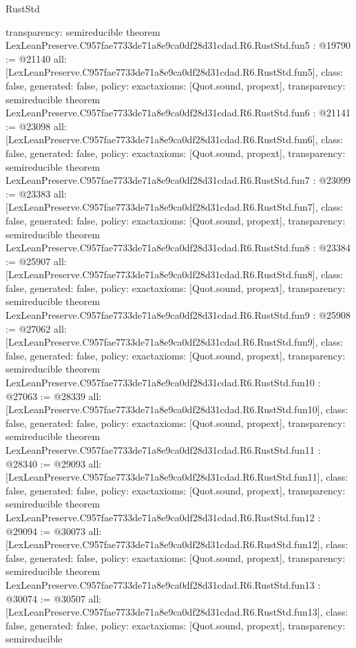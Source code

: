 \begin{lexlean}{RustStd}
\begin{coremodule}
{  transparency: semireducible
}
theorem LexLeanPreserve.C957fae7733de71a8e9ca0df28d31cdad.R6.RustStd.fun5 : @19790 := @21140 {
  all: [LexLeanPreserve.C957fae7733de71a8e9ca0df28d31cdad.R6.RustStd.fun5],
  class: false,
  generated: false,
  policy: exact{axioms: [Quot.sound, propext]},
  transparency: semireducible
}
theorem LexLeanPreserve.C957fae7733de71a8e9ca0df28d31cdad.R6.RustStd.fun6 : @21141 := @23098 {
  all: [LexLeanPreserve.C957fae7733de71a8e9ca0df28d31cdad.R6.RustStd.fun6],
  class: false,
  generated: false,
  policy: exact{axioms: [Quot.sound, propext]},
  transparency: semireducible
}
theorem LexLeanPreserve.C957fae7733de71a8e9ca0df28d31cdad.R6.RustStd.fun7 : @23099 := @23383 {
  all: [LexLeanPreserve.C957fae7733de71a8e9ca0df28d31cdad.R6.RustStd.fun7],
  class: false,
  generated: false,
  policy: exact{axioms: [Quot.sound, propext]},
  transparency: semireducible
}
theorem LexLeanPreserve.C957fae7733de71a8e9ca0df28d31cdad.R6.RustStd.fun8 : @23384 := @25907 {
  all: [LexLeanPreserve.C957fae7733de71a8e9ca0df28d31cdad.R6.RustStd.fun8],
  class: false,
  generated: false,
  policy: exact{axioms: [Quot.sound, propext]},
  transparency: semireducible
}
theorem LexLeanPreserve.C957fae7733de71a8e9ca0df28d31cdad.R6.RustStd.fun9 : @25908 := @27062 {
  all: [LexLeanPreserve.C957fae7733de71a8e9ca0df28d31cdad.R6.RustStd.fun9],
  class: false,
  generated: false,
  policy: exact{axioms: [Quot.sound, propext]},
  transparency: semireducible
}
theorem LexLeanPreserve.C957fae7733de71a8e9ca0df28d31cdad.R6.RustStd.fun10 : @27063 := @28339 {
  all: [LexLeanPreserve.C957fae7733de71a8e9ca0df28d31cdad.R6.RustStd.fun10],
  class: false,
  generated: false,
  policy: exact{axioms: [Quot.sound, propext]},
  transparency: semireducible
}
theorem LexLeanPreserve.C957fae7733de71a8e9ca0df28d31cdad.R6.RustStd.fun11 : @28340 := @29093 {
  all: [LexLeanPreserve.C957fae7733de71a8e9ca0df28d31cdad.R6.RustStd.fun11],
  class: false,
  generated: false,
  policy: exact{axioms: [Quot.sound, propext]},
  transparency: semireducible
}
theorem LexLeanPreserve.C957fae7733de71a8e9ca0df28d31cdad.R6.RustStd.fun12 : @29094 := @30073 {
  all: [LexLeanPreserve.C957fae7733de71a8e9ca0df28d31cdad.R6.RustStd.fun12],
  class: false,
  generated: false,
  policy: exact{axioms: [Quot.sound, propext]},
  transparency: semireducible
}
theorem LexLeanPreserve.C957fae7733de71a8e9ca0df28d31cdad.R6.RustStd.fun13 : @30074 := @30507 {
  all: [LexLeanPreserve.C957fae7733de71a8e9ca0df28d31cdad.R6.RustStd.fun13],
  class: false,
  generated: false,
  policy: exact{axioms: [Quot.sound, propext]},
  transparency: semireducible
}
\end{coremodule}
\end{lexlean}
